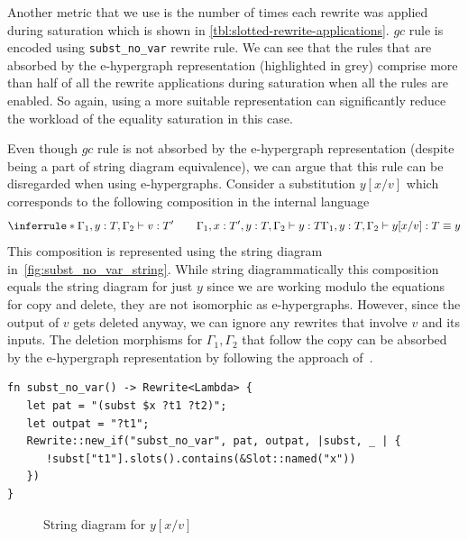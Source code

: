 Another metric that we use is the number of times each rewrite was applied during saturation which is shown in \autoref{tbl:slotted-rewrite-applications}.
$gc$ rule is encoded using \texttt{subst\_no\_var} rewrite rule.
We can see that the rules that are absorbed by the e-hypergraph representation (highlighted in grey) comprise more than half of all the rewrite applications during saturation when all the rules are enabled.
So again, using a more suitable representation can significantly reduce the workload of the equality saturation in this case.

\begin{rem}
	Even though $gc$ rule is not absorbed by the e-hypergraph representation (despite being a part of string diagram equivalence), we can argue that this rule can be disregarded when using e-hypergraphs.
	Consider a substitution $y[x / v]$ which corresponds to the following composition in the internal language
	\[
		\inferrule*{\Gamma_1,y : T, \Gamma_2 \vdash v : T' \qquad \Gamma_1, x : T', y : T, \Gamma_2 \vdash y : T}{
			\Gamma_1, y : T, \Gamma_2 \vdash y[x / v] : T \equiv y
		}
	\]
	This composition is represented using the string diagram in~\autoref{fig:subst_no_var_string}.
	While string diagrammatically this composition equals the string diagram for just $y$ since we are working modulo the equations for copy and delete, they are not isomorphic as e-hypergraphs.
	However, since the output of $v$ gets deleted anyway, we can ignore any rewrites that involve $v$ and its inputs.
	The deletion morphisms for $\Gamma_1, \Gamma_2$ that follow the copy can be absorbed by the e-hypergraph representation by following the approach of~\citet{zanassi_comonoid}.
\end{rem}

\begin{listing}
	\begin{verbatim}
fn subst_no_var() -> Rewrite<Lambda> {
   let pat = "(subst $x ?t1 ?t2)";
   let outpat = "?t1";
   Rewrite::new_if("subst_no_var", pat, outpat, |subst, _ | {
      !subst["t1"].slots().contains(&Slot::named("x"))
   })
}
	\end{verbatim}
	\caption{$\lambda_{\text{lsub}}$ $gc$-rule}
	\label{listing:gc_rule}
\end{listing}


\begin{figure}
	\caption{String diagram for $y[x/v]$}
	\label{fig:subst_no_var_string}
\end{figure}

